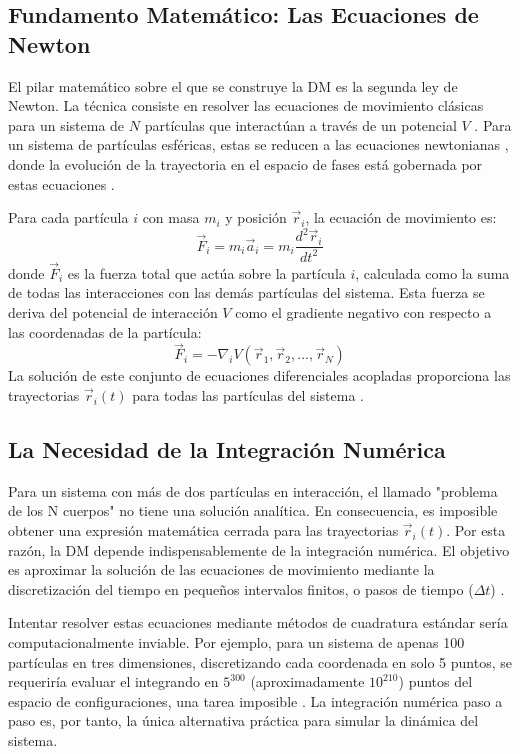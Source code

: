 \subsection{Fundamento Matemático: Las Ecuaciones de Newton}

El pilar matemático sobre el que se construye la DM es la segunda ley de Newton. La técnica consiste en resolver las ecuaciones de movimiento clásicas para un sistema de $N$ partículas que interactúan a través de un potencial $V$ \cite[23]{allen2012computer}. Para un sistema de partículas esféricas, estas se reducen a las ecuaciones newtonianas \cite[23]{allen2012computer}, donde la evolución de la trayectoria en el espacio de fases está gobernada por estas ecuaciones \cite[108]{haile1992molecular}.

Para cada partícula $i$ con masa $m_i$ y posición $\vec{r}_i$, la ecuación de movimiento es:
\begin{equation}
\vec{F}_i = m_i \vec{a}_i = m_i \frac{d^2\vec{r}_i}{dt^2}
\end{equation}
donde $\vec{F}_i$ es la fuerza total que actúa sobre la partícula $i$, calculada como la suma de todas las interacciones con las demás partículas del sistema. Esta fuerza se deriva del potencial de interacción $V$ como el gradiente negativo con respecto a las coordenadas de la partícula:
\begin{equation}
\vec{F}_i = -\nabla_i V(\vec{r}_1, \vec{r}_2, ..., \vec{r}_N)
\end{equation}
La solución de este conjunto de ecuaciones diferenciales acopladas proporciona las trayectorias $\vec{r}_i(t)$ para todas las partículas del sistema \cite[30]{haile1992molecular}.

\subsection{La Necesidad de la Integración Numérica}

Para un sistema con más de dos partículas en interacción, el llamado "problema de los N cuerpos" no tiene una solución analítica. En consecuencia, es imposible obtener una expresión matemática cerrada para las trayectorias $\vec{r}_i(t)$. Por esta razón, la DM depende indispensablemente de la integración numérica. El objetivo es aproximar la solución de las ecuaciones de movimiento mediante la discretización del tiempo en pequeños intervalos finitos, o pasos de tiempo ($\Delta t$) \cite[446]{jensen2017introduction}.

Intentar resolver estas ecuaciones mediante métodos de cuadratura estándar sería computacionalmente inviable. Por ejemplo, para un sistema de apenas 100 partículas en tres dimensiones, discretizando cada coordenada en solo 5 puntos, se requeriría evaluar el integrando en $5^{300}$ (aproximadamente $10^{210}$) puntos del espacio de configuraciones, una tarea imposible \cite[55]{frenkel2002understanding}. La integración numérica paso a paso es, por tanto, la única alternativa práctica para simular la dinámica del sistema.

